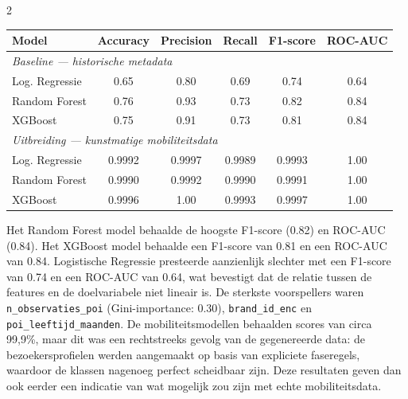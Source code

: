 \documentclass[a0,portrait]{hogent-poster}
\begin{document}
\begin{multicols}{2}
\begin{center}
    \captionsetup{type=table}
    \begin{tabular}{lccccc}
        \toprule
        \textbf{Model} & \textbf{Accuracy} & \textbf{Precision} & \textbf{Recall} & \textbf{F1-score} & \textbf{ROC-AUC} \\
        \midrule
        \multicolumn{6}{l}{\textit{Baseline — historische metadata}} \\
        \midrule
        Log. Regressie & 0.65 & 0.80 & 0.69 & 0.74 & 0.64 \\
        Random Forest  & 0.76 & 0.93 & 0.73 & 0.82 & 0.84 \\
        XGBoost        & 0.75 & 0.91 & 0.73 & 0.81 & 0.84 \\
        \midrule
        \multicolumn{6}{l}{\textit{Uitbreiding — kunstmatige mobiliteitsdata}} \\
        \midrule
        Log. Regressie & 0.9992 & 0.9997 & 0.9989 & 0.9993 & 1.00 \\
        Random Forest  & 0.9990 & 0.9992 & 0.9990 & 0.9991 & 1.00 \\
        XGBoost        & 0.9996 & 1.00   & 0.9993 & 0.9997 & 1.00 \\
        \bottomrule
    \end{tabular}
    \label{tab:resultaten}
\end{center}

Het Random Forest model behaalde de hoogste F1-score (0.82) en ROC-AUC (0.84). Het XGBoost model behaalde een F1-score van 0.81 en een ROC-AUC van 0.84. Logistische Regressie presteerde aanzienlijk slechter met een F1-score van 0.74 en een ROC-AUC van 0.64, wat bevestigt dat de relatie tussen de features en de doelvariabele niet lineair is. De sterkste voorspellers waren \texttt{n\_observaties\_poi} (Gini-importance: 0.30), \texttt{brand\_id\_enc} en \texttt{poi\_leeftijd\_maanden}. De mobiliteitsmodellen behaalden scores van circa 99,9\%, maar dit was een rechtstreeks gevolg van de gegenereerde data: de bezoekersprofielen werden aangemaakt op basis van expliciete faseregels, waardoor de klassen nagenoeg perfect scheidbaar zijn. Deze resultaten geven dan ook eerder een indicatie van wat mogelijk zou zijn met echte mobiliteitsdata.


\end{multicols}
\end{document}
